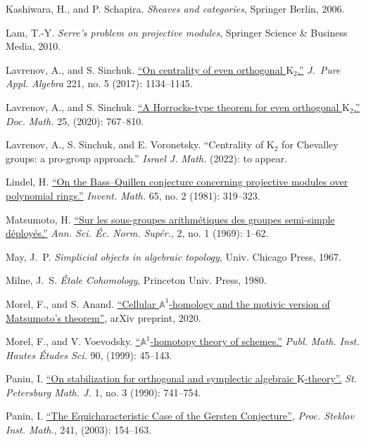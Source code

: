 \documentclass[oneside, 11pt]{amsart}
\numberwithin{equation}{section}
\newcommand{\K}{{\mathrm{K}}}
\theoremstyle{definition}
\theoremstyle{definition}
\theoremstyle{remark}
\begin{document}
\begin{thebibliography}{0}
Kashiwara, H., and P. Schapira. \textit{Sheaves and categories}, Springer Berlin, 2006.

Lam, T.-Y. \textit{Serre's problem on projective modules}, Springer Science \& Business Media, 2010.

Lavrenov, A., and S. Sinchuk.
\href{https://arxiv.org/pdf/1606.00272.pdf}{``On centrality of even orthogonal $\K_2$.''}
\textit{J.~Pure Appl. Algebra} 221, no. {5} (2017): {1134--1145}.

Lavrenov, A., and S. Sinchuk.
\href{http://dx.doi.org/10.25537/dm.2020v25.767-809}{``A Horrocks-type theorem for even orthogonal $\K_2$.''}
\textit{Doc. Math.} 25, (2020): {767--810}.

Lavrenov, A., S. Sinchuk, and E. Voronetsky.
``Centrality of $\K_2$ for Chevalley groups: a pro-group approach.''
\textit{Israel J. Math.} (2022): to appear.

 Lindel, H. \href{http://eudml.org/doc/142853}{``On the Bass--Quillen conjecture concerning projective modules over polynomial rings.''} \textit{Invent. Math.} 65, no. 2 (1981): 319--323.  

Matsumoto, H.
\href{http://eudml.org/doc/81843}{``Sur les sous-groupes arithm{\'e}tiques des groupes semi-simple d{\'e}ploy{\'e}s.''}
\textit{Ann. Sci. {\'E}c. Norm. Sup{\'e}r.}, 2, no. 1 (1969): 1--62.

May, J.~P.
\textit{Simplicial objects in algebraic topology}, Univ. Chicago Press, 1967.

Milne, J.~S. \textit{{\'E}tale Cohomology}, Princeton Univ. Press, 1980.

Morel, F., and S. Anand.
\href{https://arxiv.org/abs/2007.14770}{``Cellular $\mathbb{A}^1$-homology and the motivic version of Matsumoto's theorem''}, arXiv preprint, 2020.

Morel, F., and V. Voevodsky.
\href{http://www.numdam.org/item/PMIHES_1999__90__45_0/}{``$\mathbb{A}^1$-homotopy theory of schemes.''} \textit{Publ. Math. Inst. Hautes {\'E}tudes Sci.} 90, (1999): {45--143}.

Panin, I.
\href{http://www.mathnet.ru/links/a46c953dc23ca4b3c44578c283cd59c8/aa27.pdf}{``On stabilization for orthogonal and symplectic algebraic $\K$-theory''.}
\textit{St. Petersburg Math. J.} 1, no. 3 (1990): 741--754.

 Panin, I. \href{http://mi.mathnet.ru/tm394}{``The Equicharacteristic Case of the Gersten Conjecture''},
\textit{Proc. Steklov Inst. Math.}, 241, (2003): 154--163.


\end{thebibliography}
\end{document}
